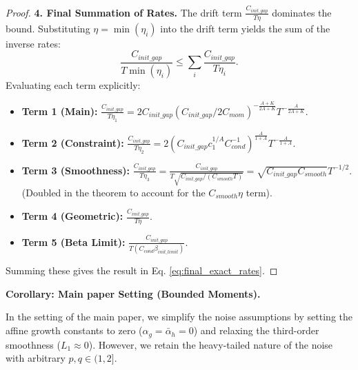 \documentclass{article}
\theoremstyle{plain}
\theoremstyle{definition}
\theoremstyle{remark}
\begin{document}
\begin{proof}
\textbf{4. Final Summation of Rates.}
The drift term $\frac{C_{init\_gap}}{T \eta}$ dominates the bound. Substituting $\eta = \min(\eta_i)$ into the drift term yields the sum of the inverse rates:
$$ \frac{C_{init\_gap}}{T \min(\eta_i)} \le \sum_{i} \frac{C_{init\_gap}}{T \eta_i}. $$
Evaluating each term explicitly:
\begin{itemize}
    \item \textbf{Term 1 (Main):} $\frac{C_{init\_gap}}{T \eta_1} = 2 C_{init\_gap} (C_{init\_gap}/2C_{mom})^{-\frac{A+K}{2A+K}} T^{-\frac{A}{2A+K}}$.
    \item \textbf{Term 2 (Constraint):} $\frac{C_{init\_gap}}{T \eta_2} = 2 (C_{init\_gap} c_1^{1/A} C_{cond}^{-1})^{\frac{A}{1+A}} T^{-\frac{A}{1+A}}$.
    \item \textbf{Term 3 (Smoothness):} $\frac{C_{init\_gap}}{T \eta_3} = \frac{C_{init\_gap}}{T \sqrt{C_{init\_gap}/(C_{smooth}T)}} = \sqrt{C_{init\_gap} C_{smooth}} T^{-1/2}$. (Doubled in the theorem to account for the $C_{smooth}\eta$ term).
    \item \textbf{Term 4 (Geometric):} $\frac{C_{init\_gap}}{T \bar{\eta}}$.
    \item \textbf{Term 5 (Beta Limit):} $\frac{C_{init\_gap}}{T (C_{cond} \beta_{init\_limit})}$.
\end{itemize}
Summing these gives the result in Eq. \eqref{eq:final_exact_rates}.
\end{proof}

\textbf{Corollary: Main paper Setting (Bounded Moments).}

In the setting of the main paper, we simplify the noise assumptions by setting the affine growth constants to zero ($\alpha_g = \bar{\alpha}_h = 0$) and relaxing the third-order smoothness ($L_1 \approx 0$). However, we retain the heavy-tailed nature of the noise with arbitrary $p, q \in (1, 2]$.
\end{document}
